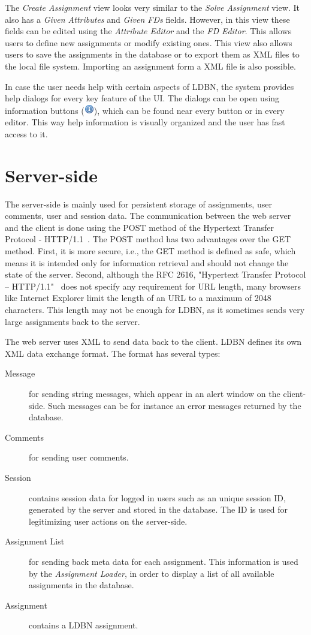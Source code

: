 The \textit{Create Assignment} view looks very similar to the 
\textit{Solve Assignment} view. It also has a \textit{Given Attributes} and 
\textit{Given FDs} fields. However, in this view these fields
can be edited using the \textit{Attribute Editor} and the \textit{FD Editor}. 
This allows users to define new assignments or modify existing ones. This view
also allows users to save the assignments in the database or to export them as XML
files to the local file system. Importing an assignment form a XML file is also 
possible.  

In case the user needs help with certain aspects of LDBN, the system provides 
help dialogs for every key feature of the UI. The dialogs can be open
using information buttons (\includegraphics[scale=0.5]{./img/info.png}), which can be
found near every button or in every editor. This way help information is 
visually organized and the user has fast access to it.

\section{Server-side}
The server-side is mainly used for persistent storage of assignments, user comments,
user and session data. The communication between the web server and the client
is done using the POST method of the Hypertext Transfer Protocol - HTTP/1.1~\cite{w6}.
The POST method has two advantages over the GET method. First, it is more secure, i.e., 
the GET method is defined as safe, which means it is intended only for information 
retrieval and should not change the state of the server. Second, although the
RFC 2616, "Hypertext Transfer Protocol -- HTTP/1.1"~\cite{w6} does not specify
any requirement for URL length, many browsers like Internet Explorer limit
the length of an URL to a maximum of 2048 characters. This length may not be 
enough for LDBN, as it sometimes sends very large assignments back to the server.  

The web server uses XML to send data back to the client. LDBN defines its own XML data
exchange format. The format has several types:

\begin{description}
	\item[Message] for sending string messages, which appear in an alert window on 
	the client-side. Such messages can be for instance an error messages returned
	by the database. 
	\item[Comments] for sending user comments. 
	\item[Session] contains session data for logged in users such as an unique session 
	ID, generated by the server and stored in the database. The ID is used for
	legitimizing user actions on the server-side.
	\item[Assignment List] for sending back meta data for each assignment. This
	information is used by the \textit{Assignment Loader}, in order to display a list
	of all available assignments in the database.
	\item[Assignment] contains a LDBN assignment. 
\end{description}  

